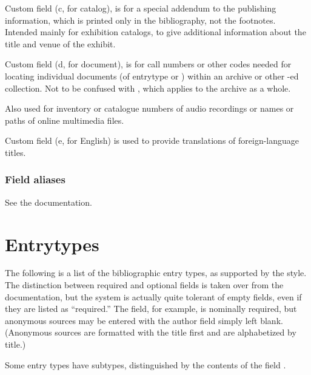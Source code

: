 \documentclass{ltxdockit}[2010/02/12]
\begin{document}
\begin{fieldlist}

Custom field  (c, for catalog), is for a special addendum to the publishing information, which is printed only in the bibliography, not the footnotes. Intended mainly for exhibition catalogs, to give additional information about the title and venue of the exhibit.



Custom field  (d, for document), is for call numbers or other codes needed for locating individual documents (of entrytype  or ) within an archive or other -ed collection. Not to be confused with , which applies to the archive as a whole.

Also used for inventory or catalogue numbers of audio recordings or names or paths of online multimedia files.


Custom field  (e, for English) is used to provide translations of foreign-language titles. 



\end{fieldlist}

\subsubsection{Field aliases}

See the  documentation.



\section{Entrytypes}\label{entrytypes}

The following is a list of the bibliographic entry types, as supported by the  style. The distinction between required and optional fields is taken over from the  documentation, but the system is actually quite tolerant of empty fields, even if they are listed as ``required.'' 
The  field, for example, is nominally required, but anonymous sources may be entered with the author field simply left blank. (Anonymous sources are formatted with the title first and are alphabetized by title.)


Some entry types have subtypes, distinguished by the contents of the field .
\end{document}
